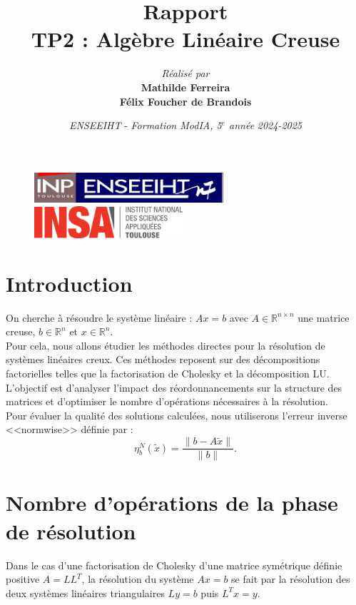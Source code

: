\documentclass[12pt,a4paper]{article}
\title{\vspace{4cm}
        Rapport \\
        \vspace{1cm} \textbf{TP2 : Algèbre Linéaire Creuse} \\ 
        \vspace{4cm} 
}
\author{\textit{Réalisé par} \vspace{0.5cm}\\
         \textbf{Mathilde Ferreira} \\
        \textbf{Félix Foucher de Brandois}
}
\date{\vfill
        \textit{ENSEEIHT} - 
        \textit{Formation ModIA, 5$^{e}$ année}
        \hfill
        \textit{2024-2025} \\
        \vspace{1cm}
}
\begin{document}
\begin{figure}[t]
    \centering
    \includegraphics[width=7cm]{src/inp_n7.png}
    \hfill
    \includegraphics[width=5.5cm]{src/insa_toulouse.png}
\end{figure}


\maketitle
\thispagestyle{empty}

\newpage


\section{Introduction}

\noindent On cherche à résoudre le système linéaire : $Ax = b$ 
avec $A \in \mathbb{R}^{n \times n}$ une matrice creuse, $b \in \mathbb{R}^{n}$ et $x \in \mathbb{R}^{n}$. \\

Pour cela, nous allons étudier les méthodes directes pour la résolution de systèmes linéaires creux.
Ces méthodes reposent sur des décompositions factorielles telles que la factorisation de Cholesky et la décomposition LU. \\

L'objectif est d'analyser l'impact des réordonnancements sur la structure des matrices et d'optimiser le nombre d'opérations nécessaires à la résolution. \\

Pour évaluer la qualité des solutions calculées, nous utiliserons l'erreur inverse <<normwise>> définie par :
$$
\eta_b^N(\tilde{x}) = \frac{\|b - A\tilde{x}\|}{\|b\|}.
$$

\section{Nombre d'opérations de la phase de résolution}

Dans le cas d'une factorisation de Cholesky d'une matrice symétrique définie positive $A = LL^T$, la résolution du système $Ax = b$ se fait par la résolution des deux systèmes linéaires triangulaires $Ly = b$ puis $L^Tx = y$. \\
\end{document}
